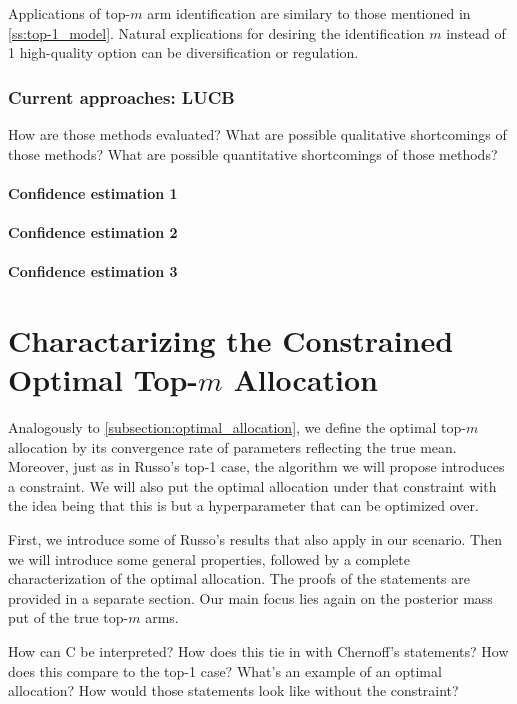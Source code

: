 Applications of top-$m$ arm identification are similary to those mentioned in \ref{ss:top-1_model}. Natural explications for desiring the identification $m$ instead of 1 high-quality option can be diversification or regulation.

\subsection{Current approaches: LUCB}
How are those methods evaluated?
What are possible qualitative shortcomings of those methods?
What are possible quantitative shortcomings of those methods?

\subsubsection{Confidence estimation 1}
\subsubsection{Confidence estimation 2}
\subsubsection{Confidence estimation 3}


\chapter{Charactarizing the Constrained Optimal Top-$m$ Allocation}
Analogously to \ref{subsection:optimal_allocation}, we define the optimal top-$m$ allocation by its convergence rate of parameters reflecting the true mean. Moreover, just as in Russo's top-1 case, the algorithm we will propose introduces a constraint. We will also put the optimal allocation under that constraint with the idea being that this is but a hyperparameter that can be optimized over.

First, we introduce some of Russo's results that also apply in our scenario. Then we will introduce some general properties, followed by a complete characterization of the optimal allocation. The proofs of the statements are provided in a separate section. Our main focus lies again on the posterior mass put  of the true top-$m$ arms.



How can C be interpreted?
How does this tie in with Chernoff's statements?
How does this compare to the top-1 case?
What's an example of an optimal allocation?
How would those statements look like without the constraint?

